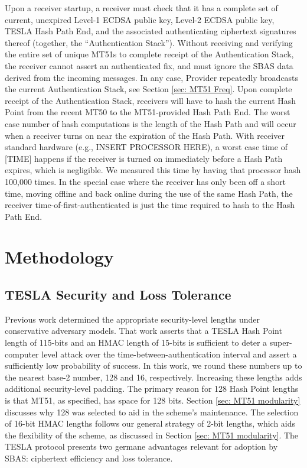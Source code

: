 \documentclass[letterpaper,times]{IONconf/IONconf}
\begin{document}
Upon a receiver startup, a receiver must check that it has a complete set of current, unexpired Level-1 ECDSA public key, Level-2 ECDSA public key, TESLA Hash Path End, and the associated authenticating ciphertext signatures thereof (together, the ``Authentication Stack'').
Without receiving and verifying the entire set of unique MT51s to complete receipt of the Authentication Stack, the receiver cannot assert an authenticated fix, and must ignore the SBAS data derived from the incoming messages.
In any case, Provider repeatedly broadcasts the current Authentication Stack, see Section \ref{sec: MT51 Freq}.
Upon complete receipt of the Authentication Stack, receivers will have to hash the current Hash Point from the recent MT50 to the MT51-provided Hash Path End.
The worst case number of hash computations is the length of the Hash Path and will occur when a receiver turns on near the expiration of the Hash Path.
With receiver standard hardware (e.g., INSERT PROCESSOR HERE), a worst case time of [TIME] happens if the receiver is turned on immediately before a Hash Path expires, which is negligible.
We measured this time by having that processor hash 100,000 times.
In the special case where the receiver has only been off a short time, moving offline and back online during the use of the same Hash Path, the receiver time-of-first-authenticated is just the time required to hash to the Hash Path End.

\section{Methodology} \label{sec: methodology}

\subsection{TESLA Security and Loss Tolerance}

Previous work determined the appropriate security-level lengths under conservative adversary models\cite{Neish_Dissertation}.
That work asserts that a TESLA Hash Point length of 115-bits and an HMAC length of 15-bits is sufficient to deter a super-computer level attack over the time-between-authentication interval and assert a sufficiently low probability of success.
In this work, we round these numbers up to the nearest base-2 number, 128 and 16, respectively.
Increasing these lengths adds additional security-level padding.
The primary reason for 128 Hash Point lengths is that MT51, as specified, has space for 128 bits.
Section \ref{sec: MT51 modularity} discusses why 128 was selected to aid in the scheme's maintenance.
The selection of 16-bit HMAC lengths follows our general strategy of 2-bit lengths, which aids the flexibility of the scheme, as discussed in Section \ref{sec: MT51 modularity}.
The TESLA protocol presents two germane advantages relevant for adoption by SBAS: ciphertext efficiency and loss tolerance.
\end{document}
